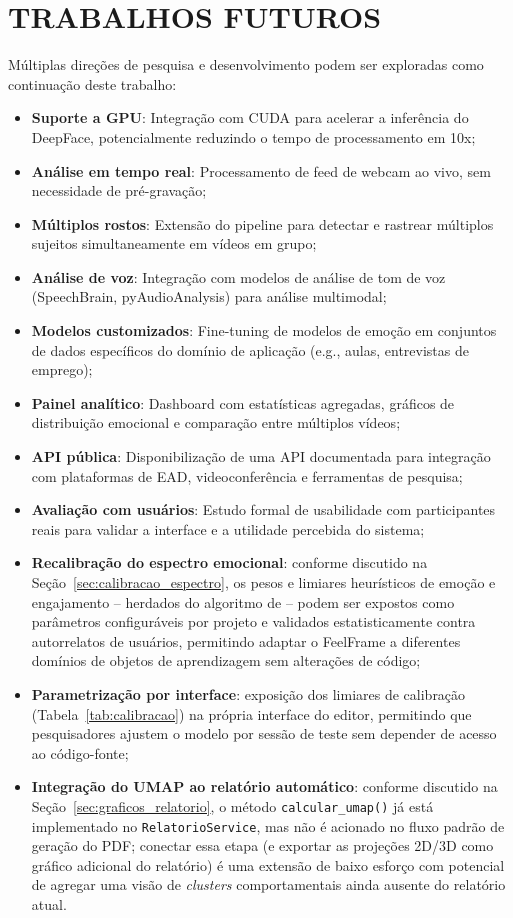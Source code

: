 \documentclass[
	12pt,
	openright,
	oneside,
	a4paper,
	english,
	brazil
	]{abntex2}
\begin{document}
\section{TRABALHOS FUTUROS}
\label{sec:trabalhos_futuros}

Múltiplas direções de pesquisa e desenvolvimento podem ser exploradas como continuação deste trabalho:

\begin{itemize}
    \item \textbf{Suporte a GPU}: Integração com CUDA para acelerar a inferência do DeepFace, potencialmente reduzindo o tempo de processamento em 10x;
    \item \textbf{Análise em tempo real}: Processamento de feed de webcam ao vivo, sem necessidade de pré-gravação;
    \item \textbf{Múltiplos rostos}: Extensão do pipeline para detectar e rastrear múltiplos sujeitos simultaneamente em vídeos em grupo;
    \item \textbf{Análise de voz}: Integração com modelos de análise de tom de voz (SpeechBrain, pyAudioAnalysis) para análise multimodal;
    \item \textbf{Modelos customizados}: Fine-tuning de modelos de emoção em conjuntos de dados específicos do domínio de aplicação (e.g., aulas, entrevistas de emprego);
    \item \textbf{Painel analítico}: Dashboard com estatísticas agregadas, gráficos de distribuição emocional e comparação entre múltiplos vídeos;
    \item \textbf{API pública}: Disponibilização de uma API documentada para integração com plataformas de EAD, videoconferência e ferramentas de pesquisa;
    \item \textbf{Avaliação com usuários}: Estudo formal de usabilidade com participantes reais para validar a interface e a utilidade percebida do sistema;
    \item \textbf{Recalibração do espectro emocional}: conforme discutido na Seção~\ref{sec:calibracao_espectro}, os pesos e limiares heurísticos de emoção e engajamento -- herdados do algoritmo de \cite{nascimento2024nelson} -- podem ser expostos como parâmetros configuráveis por projeto e validados estatisticamente contra autorrelatos de usuários, permitindo adaptar o FeelFrame a diferentes domínios de objetos de aprendizagem sem alterações de código;
    \item \textbf{Parametrização por interface}: exposição dos limiares de calibração (Tabela~\ref{tab:calibracao}) na própria interface do editor, permitindo que pesquisadores ajustem o modelo por sessão de teste sem depender de acesso ao código-fonte;
    \item \textbf{Integração do UMAP ao relatório automático}: conforme discutido na Seção~\ref{sec:graficos_relatorio}, o método \texttt{calcular\_umap()} já está implementado no \texttt{RelatorioService}, mas não é acionado no fluxo padrão de geração do PDF; conectar essa etapa (e exportar as projeções 2D/3D como gráfico adicional do relatório) é uma extensão de baixo esforço com potencial de agregar uma visão de \textit{clusters} comportamentais ainda ausente do relatório atual.
\end{itemize}
\end{document}

